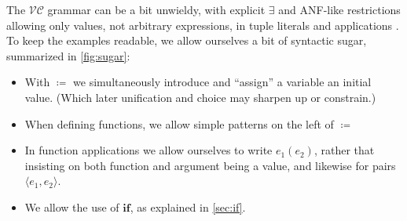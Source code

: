 \documentclass[acmsmall,review,dvipsnames]{acmart}
\newcommand{\Varid}[1]{\mathit{#1}}
\newcommand{\versecalc}{$\mathcal{VC}$}
\begin{document}
The {\versecalc} grammar can be a bit unwieldy, with explicit \ensuremath{\exists} and ANF-like restrictions allowing only values,
not arbitrary expressions, in tuple literals and applications \cite{felleisen:anf}.
To keep the examples readable, we allow ourselves a bit of syntactic sugar, summarized in \cref{fig:sugar}:
\begin{itemize}
\item With \ensuremath{\mathrel{\coloneqq}} we simultaneously introduce and ``assign'' a variable
  an initial value. (Which later unification and choice may sharpen up
  or constrain.)
\item When defining functions, we allow simple patterns on the left of \ensuremath{\mathrel{\coloneqq}}
\item In function applications we allow ourselves to write \ensuremath{\Varid{e}_{\mathrm{1}}(\Varid{e}_{\mathrm{2}})},
  rather that insisting on both function and argument being a value, and
  likewise for pairs \ensuremath{\langle{}\Varid{e}_{\mathrm{1}},\Varid{e}_{\mathrm{2}}\rangle}.
\item We allow the use of \ensuremath{\textbf{if}}, as explained in \cref{sec:if}.
\end{itemize}
\end{document}
